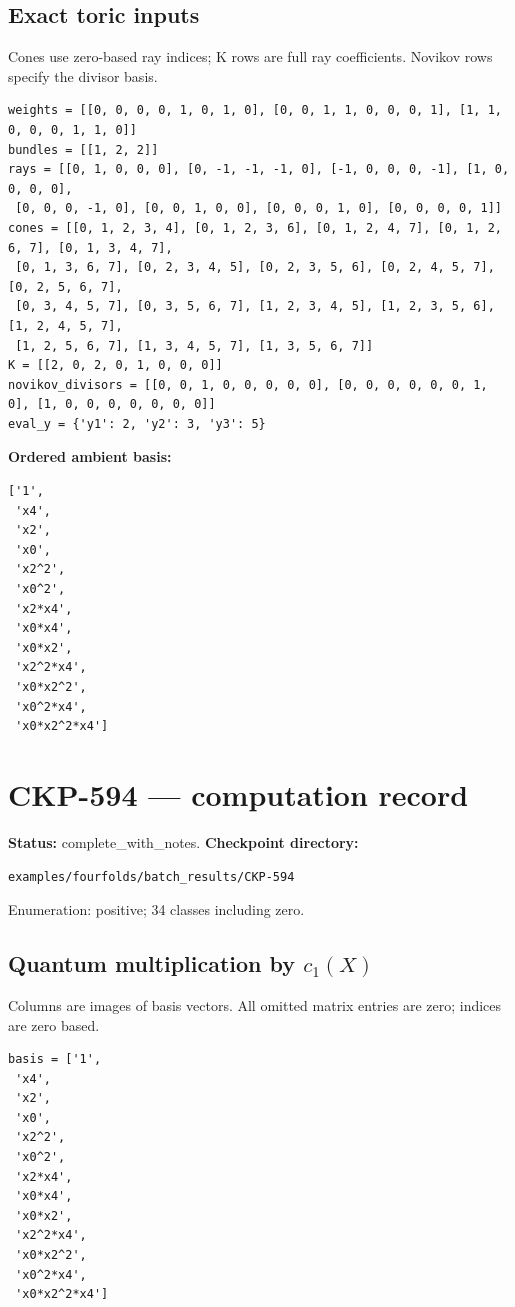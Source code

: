\documentclass[10pt,a4paper]{article}
\begin{document}
\subsection*{Exact toric inputs}
Cones use zero-based ray indices; K rows are full ray coefficients. Novikov rows specify the divisor basis.

\begin{lstlisting}
weights = [[0, 0, 0, 0, 1, 0, 1, 0], [0, 0, 1, 1, 0, 0, 0, 1], [1, 1, 0, 0, 0, 1, 1, 0]]
bundles = [[1, 2, 2]]
rays = [[0, 1, 0, 0, 0], [0, -1, -1, -1, 0], [-1, 0, 0, 0, -1], [1, 0, 0, 0, 0],
 [0, 0, 0, -1, 0], [0, 0, 1, 0, 0], [0, 0, 0, 1, 0], [0, 0, 0, 0, 1]]
cones = [[0, 1, 2, 3, 4], [0, 1, 2, 3, 6], [0, 1, 2, 4, 7], [0, 1, 2, 6, 7], [0, 1, 3, 4, 7],
 [0, 1, 3, 6, 7], [0, 2, 3, 4, 5], [0, 2, 3, 5, 6], [0, 2, 4, 5, 7], [0, 2, 5, 6, 7],
 [0, 3, 4, 5, 7], [0, 3, 5, 6, 7], [1, 2, 3, 4, 5], [1, 2, 3, 5, 6], [1, 2, 4, 5, 7],
 [1, 2, 5, 6, 7], [1, 3, 4, 5, 7], [1, 3, 5, 6, 7]]
K = [[2, 0, 2, 0, 1, 0, 0, 0]]
novikov_divisors = [[0, 0, 1, 0, 0, 0, 0, 0], [0, 0, 0, 0, 0, 0, 1, 0], [1, 0, 0, 0, 0, 0, 0, 0]]
eval_y = {'y1': 2, 'y2': 3, 'y3': 5}
\end{lstlisting}

\textbf{Ordered ambient basis:}
\begin{lstlisting}
['1',
 'x4',
 'x2',
 'x0',
 'x2^2',
 'x0^2',
 'x2*x4',
 'x0*x4',
 'x0*x2',
 'x2^2*x4',
 'x0*x2^2',
 'x0^2*x4',
 'x0*x2^2*x4']
\end{lstlisting}

\clearpage\section*{CKP-594 --- computation record}
\textbf{Status:} complete\_with\_notes.
\textbf{Checkpoint directory:}
\begin{lstlisting}
examples/fourfolds/batch_results/CKP-594
\end{lstlisting}

Enumeration: positive; 34 classes including zero.
\subsection*{Quantum multiplication by $c_1(X)$}
Columns are images of basis vectors. All omitted matrix entries are zero; indices are zero based.

\begin{lstlisting}
basis = ['1',
 'x4',
 'x2',
 'x0',
 'x2^2',
 'x0^2',
 'x2*x4',
 'x0*x4',
 'x0*x2',
 'x2^2*x4',
 'x0*x2^2',
 'x0^2*x4',
 'x0*x2^2*x4']
\end{lstlisting}
\end{document}
